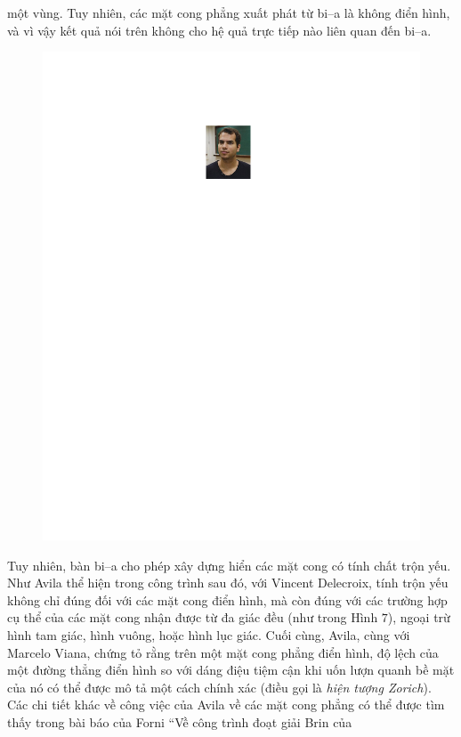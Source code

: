 \begin{multicols}{2}
	một vùng. Tuy nhiên, các mặt cong  phẳng xuất phát từ bi--a là không điển hình, và vì vậy kết quả nói trên không cho hệ quả trực tiếp nào liên quan đến bi--a.
	\begin{figure}[H]
		\vspace*{-5pt}
		\centering
		\captionsetup{labelformat= empty, justification=centering}
		\includegraphics[width= 0.85\linewidth]{8}
		\vspace*{-10pt}
	\end{figure}
	Tuy nhiên, bàn bi--a cho phép xây dựng hiển các mặt cong có tính chất trộn yếu. Như Avila thể hiện trong công trình sau đó, với Vincent Delecroix, tính trộn yếu không chỉ đúng đối với các  mặt cong điển hình, mà còn đúng với các trường hợp cụ thể của các mặt cong nhận được từ đa giác đều (như trong Hình $7$), ngoại trừ hình tam giác, hình vuông,
	hoặc hình lục giác.
	\vskip 0.1cm
	Cuối cùng, Avila, cùng với Marcelo Viana, chứng tỏ rằng trên một mặt cong phẳng điển hình, độ lệch của một đường thẳng điển hình so với dáng điệu tiệm cận khi uốn lượn quanh bề mặt của nó  có thể được mô tả một cách chính xác (điều gọi là \emph{hiện tượng Zorich}). 
	\vskip 0.1cm
	Các chi tiết khác về công việc của Avila về các mặt cong phẳng có thể được tìm thấy trong bài báo của Forni ``Về công trình đoạt giải Brin của

\end{multicols}
